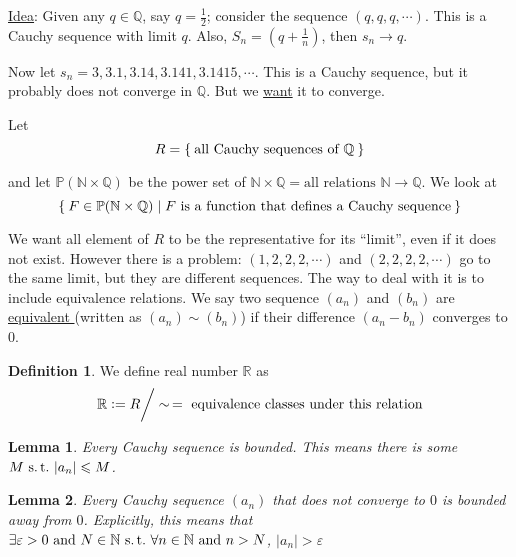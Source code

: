 \documentclass[12pt]{amsart}
\newcommand{\bbR}{\mathbb{R}}
\newcommand{\bbN}{\mathbb{N}}
\newcommand{\bbQ}{\mathbb{Q}}
\newcommand{\bbP}{\mathbb{P}}
\newcommand{\suchthat}{\operatorname{\thinspace s.t. \thinspace}}
\theoremstyle{plain}
\newtheorem*{lem}{Lemma}
\theoremstyle{remark}
\theoremstyle{definition}
\newtheorem*{define}{Definition}
\begin{document}
\ul{Idea}: Given any $q\in \bbQ$, say $q = \displaystyle\frac{1}{2}$; consider the sequence $(q,q,q,\cdots)$. This is a Cauchy sequence with limit $q$.
Also, $S_n = (q + \displaystyle \frac{1}{n})$, then $s_n \rightarrow q$.
\par
Now let $s_n = 3,3.1,3.14,3.141,3.1415,\cdots$. This is a Cauchy sequence, but it probably does not converge in $\bbQ$. But we \ul{want} it to converge.

\par
Let 
\begin{equation*}
	R = \Set{\mbox{all Cauchy sequences of } \bbQ}
\end{equation*}

\noindent and let $\bbP(\bbN \times \bbQ)$ be the power set of $\bbN \times \bbQ = \mbox{all relations } \bbN \rightarrow \bbQ$. We look at 
\begin{equation*}
	\Set{F \in \bbP(\bbN \times \bbQ) | F \mbox{ is a function that defines a Cauchy sequence}}
\end{equation*}

We want all element of $R$ to be the representative for its ``limit'', even if it does not exist. However there is a problem: $(1,2,2,2,\cdots)$ and $(2,2,2,2,\cdots)$ go to the same limit, but they are different sequences.
The way to deal with it is to include equivalence relations. We say two sequence $(a_n)$ and $(b_n)$ are \ul{equivalent } (written as $(a_n) \sim (b_n)$) if their difference $(a_n - b_n)$ converges to $0$. 

\begin{define}
	We define real number $\bbR$ as
	\begin{equation*}
		\bbR \vcentcolon = R \bigg/\sim\thinspace = \mbox{ equivalence classes under this relation}
	\end{equation*}
\end{define}

\begin{lem}
	Every Cauchy sequence is bounded. This means there is some $M \suchthat |a_n| \leqslant M$.  
\end{lem}
\begin{lem} Every Cauchy sequence $(a_n)$ that does not converge to $0$ is bounded away from $0$. Explicitly, this means that $\exists \varepsilon > 0 \mbox{ and } N \in \bbN \suchthat \forall n \in \bbN \mbox{ and } n > N$, $|a_n| > \varepsilon$  
\end{lem}
\end{document}

